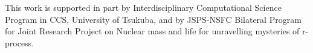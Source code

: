 \documentclass[%
superscriptaddress,
showpacs,
nofootinbib,
amsmath,amssymb,
aps,
prc,
twocolumn,
floatfix ]%
{revtex4-1}
\begin{document}
\begin{acknowledgments}
This work is supported in part
by Interdisciplinary Computational Science Program in CCS,
University of Tsukuba,
and
by JSPS-NSFC Bilateral Program for Joint Research Project
on Nuclear mass and life for unravelling mysteries of r-process.
\end{acknowledgments}



\end{document}
